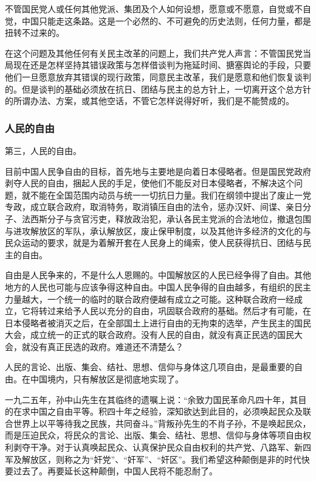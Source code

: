 不管国民党人或任何其他党派、集团及个人如何设想，愿意或不愿意，自觉或不自觉，中国只能走这条路。这是一个必然的、不可避免的历史法则，任何力量，都是扭转不过来的。

在这个问题及其他任何有关民主改革的问题上，我们共产党人声言：不管国民党当局现在还是怎样坚持其错误政策与怎样借谈判为拖延时间、搪塞舆论的手段，只要他们一旦愿意放弃其错误的现行政策，同意民主改革，我们是愿意和他们恢复谈判的。但是谈判的基础必须放在抗日、团结与民主的总方针上，一切离开这个总方针的所谓办法、方案，或其他空话，不管它怎样说得好听，我们是不能赞成的。

\subsubsection{人民的自由}

第三，人民的自由。

目前中国人民争自由的目标，首先地与主要地是向着日本侵略者。但是国民党政府剥夺人民的自由，捆起人民的手足，使他们不能反对日本侵略者，不解决这个问题，就不能在全国范围内动员与统一一切抗日力量。我们在纲领中提出了废止一党专政，成立联合政府，取消特务，取消镇压自由的法令，惩办汉奸、间谍、亲日分子、法西斯分子与贪官污吏，释放政治犯，承认各民主党派的合法地位，撤退包围与进攻解放区的军队，承认解放区，废止保甲制度，以及其他许多经济的文化的与民众运动的要求，就是为着解开套在人民身上的绳索，使人民获得抗日、团结与民主的自由。

自由是人民争来的，不是什么人恩赐的。中国解放区的人民已经争得了自由。其他地方的人民也可能与应该争得这种自由。中国人民争得的自由越多，有组织的民主力量越大，一个统一的临时的联合政府便越有成立之可能。这种联合政府一经成立，它将转过来给予人民以充分的自由，巩固联合政府的基础。然后才有可能，在日本侵略者被消灭之后，在全部国土上进行自由的无拘束的选举，产生民主的国民大会，成立统一的正式的联合政府。没有人民的自由，就没有真正民选的国民大会，就没有真正民选的政府。难道还不清楚么？

人民的言论、出版、集会、结社、思想、信仰与身体这几项自由，是最重要的自由。在中国境内，只有解放区是彻底地实现了。

一九二五年，孙中山先生在其临终的遗嘱上说：“余致力国民革命凡四十年，其目的在求中国之自由平等。积四十年之经验，深知欲达到此目的，必须唤起民众及联合世界上以平等待我之民族，共同奋斗。”背叛孙先生的不肖子孙，不是唤起民众，而是压迫民众，将民众的言论、出版、集会、结社、思想、信仰与身体等项自由权利剥夺干净。对于认真唤起民众、认真保护民众自由权利的共产党、八路军、新四军及解放区，则称之为“奸党”、“奸军”、“奸区”。我们希望这种颠倒是非的时代快要过去了。再要延长这种颠倒，中国人民将不能忍耐了。

